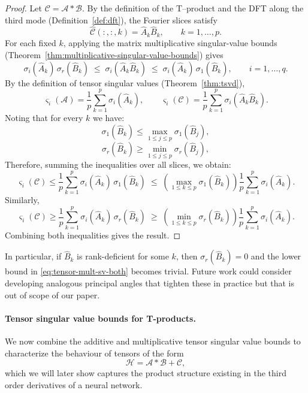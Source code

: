 \documentclass{article}
\theoremstyle{plain}
\theoremstyle{definition}
\theoremstyle{remark}
\begin{document}
\begin{proof}
Let $\mathcal{C}=\mathcal{A} * \mathcal{B}$. 
By the definition of the T--product and the DFT along the third mode
(Definition~\ref{def:dft}), the Fourier slices satisfy
\[
\widehat{\mathcal{C}}(:,:,k)=\widehat{A}_k\widehat{B}_k,
\qquad k=1,\dots,p.
\]
For each fixed $k$, applying the matrix multiplicative singular-value
bounds (Theorem~\ref{thm:multiplicative-singular-value-bounds}) gives
\[
\sigma_i(\widehat{A}_k)\,\sigma_r(\widehat{B}_k)
\;\le\;
\sigma_i(\widehat{A}_k\widehat{B}_k)
\;\le\;
\sigma_i(\widehat{A}_k)\,\sigma_1(\widehat{B}_k),
\qquad i=1,\dots,q.
\]
By the definition of tensor singular values (Theorem~\ref{thm:tsvd}),
\[
\varsigma_i(\mathcal{A})
= \frac{1}{p}\sum_{k=1}^{p}\sigma_i(\widehat{A}_k),
\qquad
\varsigma_i(\mathcal{C})
= \frac{1}{p}\sum_{k=1}^{p}\sigma_i(\widehat{A}_k\widehat{B}_k).
\]
Noting that for every $k$ we have: 
\[
\sigma_1(\widehat B_k)\le \max_{1\le j\le p}\sigma_1(\widehat B_j),
\]
\[
\sigma_r(\widehat B_k)\ge \min_{1\le j\le p}\sigma_r(\widehat B_j),
\]
Therefore, summing the inequalities over all slices, we obtain:
\[
\varsigma_i(\mathcal{C})
\le
\frac{1}{p}\sum_{k=1}^{p}\sigma_i(\widehat{A}_k)\,\sigma_1(\widehat{B}_k)
\;\le\;
\left(\max_{1\le k\le p}\sigma_1(\widehat{B}_k)\right)
\frac{1}{p}\sum_{k=1}^{p}\sigma_i(\widehat{A}_k).
\]
Similarly,
\[
\varsigma_i(\mathcal{C})
\ge
\frac{1}{p}\sum_{k=1}^{p}\sigma_i(\widehat{A}_k)\,\sigma_r(\widehat{B}_k)
\;\ge\;
\left(\min_{1\le k\le p}\sigma_r(\widehat{B}_k)\right)
\frac{1}{p}\sum_{k=1}^{p}\sigma_i(\widehat{A}_k).
\]
Combining both inequalities gives the result.
\end{proof}

In particular, if $\widehat{B}_k$ is rank-deficient for some $k$, then $\sigma_r(\widehat{B}_k)=0$ and the lower bound in \eqref{eq:tensor-mult-sv-both} becomes trivial. Future work could consider developing analogous principal angles that tighten these in practice but that is out of scope of our paper. 

\paragraph{Tensor singular value bounds for T-products.}
We now combine the additive and multiplicative tensor singular value bounds to characterize the behaviour of tensors of the form
\[
\mathcal{H} = \mathcal{A} * \mathcal{B} + \mathcal{C},
\]
which we will later show captures the product structure existing in the third order derivatives of a neural network.
\end{document}
